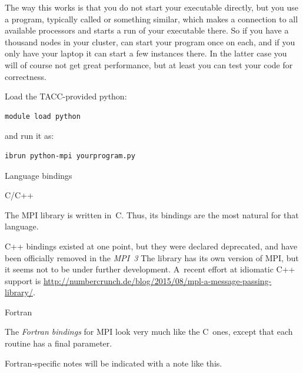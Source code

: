 The way this works is that you do not start your executable directly,
but you use a program, typically called  or
something similar, which makes a connection to all available
processors and starts a run of your executable there. So if you have a
thousand nodes in your cluster,  can start your program once
on each, and if you only have your laptop it can start a few instances
there. In the latter case you will of course not get great
performance, but at least you can test your code for correctness.

\begin{tacc}
  \begin{pythonnote}
    Load the TACC-provided python:
\begin{verbatim}
module load python
\end{verbatim}
and run it as:
\begin{verbatim}
ibrun python-mpi yourprogram.py
\end{verbatim}
  \end{pythonnote}
\end{tacc}

 {Language bindings}

 {C/C++}

The MPI library is written in~C. Thus, its bindings are the most natural
for that language.

C++ bindings existed at one point, but they were declared deprecated,
and have been officially removed in the \emph{MPI~3}%
The  library has its own version of MPI, but it seems
not to be under further development.  A~recent
effort at idiomatic C++ support is 
\url{http://numbercrunch.de/blog/2015/08/mpl-a-message-passing-library/}.


 {Fortran}

The \emph{Fortran bindings} for MPI look very much like the C~ones, except that
each routine has a final  parameter.

\begin{fortrannote}
  Fortran-specific notes will be indicated with a note like this.
\end{fortrannote}

